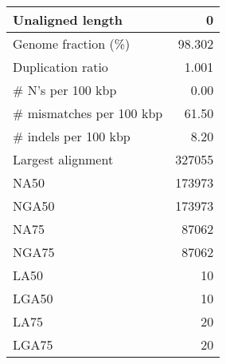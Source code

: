 \documentclass[12pt,a4paper]{article}
\begin{document}
\begin{table}[ht]
\begin{center}
\begin{tabular}{|l*{1}{|r}|}
Unaligned length & 0 \\ \hline
Genome fraction (\%) & 98.302 \\ \hline
Duplication ratio & 1.001 \\ \hline
\# N's per 100 kbp & 0.00 \\ \hline
\# mismatches per 100 kbp & 61.50 \\ \hline
\# indels per 100 kbp & 8.20 \\ \hline
Largest alignment & 327055 \\ \hline
NA50 & 173973 \\ \hline
NGA50 & 173973 \\ \hline
NA75 & 87062 \\ \hline
NGA75 & 87062 \\ \hline
LA50 & 10 \\ \hline
LGA50 & 10 \\ \hline
LA75 & 20 \\ \hline
LGA75 & 20 \\ \hline
\end{tabular}
\end{center}
\end{table}
\end{document}
